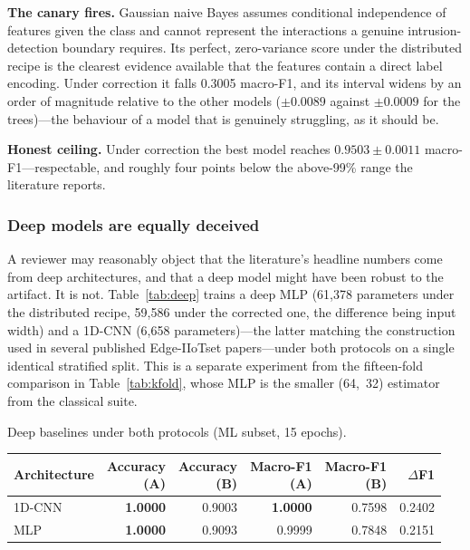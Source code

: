 \textbf{The canary fires.} Gaussian naive Bayes assumes conditional
independence of features given the class and cannot represent the interactions
a genuine intrusion-detection boundary requires. Its perfect, zero-variance
score under the distributed recipe is the clearest evidence available that the
features contain a direct label encoding. Under correction it falls 0.3005
macro-F1, and its interval widens by an order of magnitude relative to the
other models ($\pm 0.0089$ against $\pm 0.0009$ for the trees)---the behaviour
of a model that is genuinely struggling, as it should be.

\textbf{Honest ceiling.} Under correction the best model reaches $0.9503 \pm
0.0011$ macro-F1---respectable, and roughly four points below the above-99\%
range the literature reports.

\subsubsection{Deep models are equally deceived}

A reviewer may reasonably object that the literature's headline numbers come
from deep architectures, and that a deep model might have been robust to the
artifact. It is not. Table~\ref{tab:deep} trains a deep MLP (61{,}378
parameters under the distributed recipe, 59{,}586 under the corrected one, the
difference being input width) and a 1D-CNN (6{,}658 parameters)---the latter
matching the construction used in several published Edge-IIoTset papers---under
both protocols on a single identical stratified split. This is a separate
experiment from the fifteen-fold comparison in Table~\ref{tab:kfold}, whose MLP
is the smaller \mbox{(64, 32)} estimator from the classical suite.

\begin{wtable}
\centering
\footnotesize
\caption{Deep baselines under both protocols (ML subset, 15 epochs).}
\label{tab:deep}
\begin{fittable}
\begin{tabular}{lrrrrr}
\toprule
Architecture & \makecell{Accuracy\\(A)} & \makecell{Accuracy\\(B)} & \makecell{Macro-F1\\(A)} & \makecell{Macro-F1\\(B)} & $\Delta$F1 \\
\midrule
1D-CNN & \textbf{1.0000} & 0.9003 & \textbf{1.0000} & 0.7598 & 0.2402 \\
MLP    & \textbf{1.0000} & 0.9093 & 0.9999 & 0.7848 & 0.2151 \\
\bottomrule
\end{tabular}
\end{fittable}
\end{wtable}

